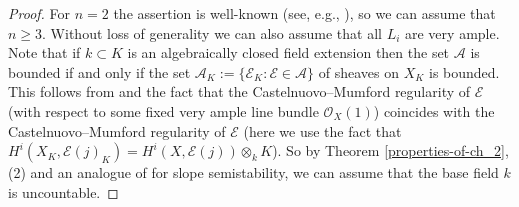 \documentclass[12pt]{article}
\theoremstyle{plain}
\theoremstyle{definition}
\theoremstyle{remark}
\newcommand{\cA}{{\mathcal A}}
\newcommand{\cE}{{\mathcal E}}
\newcommand{\cO}{{\mathcal O}}
\begin{document}
\begin{proof} For $n=2$ the assertion is well-known (see, e.g.,  \cite[Theorem 4.4]{La1}), so we can assume that $n\ge 3$. Without loss of generality we can also  assume that  all $L_i$ are very ample.
Note that if $k\subset K$ is an algebraically closed field extension then the set $\cA$ is bounded if and only if the set $\cA_K:= \{ \cE_K: \cE \in \cA\}$ of sheaves on $X_K$ is bounded. This follows from 
\cite[Lemma 1.7.6]{HL} and the fact that the Castelnuovo--Mumford regularity of $\cE$ (with respect to some fixed very ample line bundle $\cO_X(1)$) coincides with the Castelnuovo--Mumford regularity of $\cE$ (here we use the fact that $H^i(X_K, \cE(j)_K)= H^i(X, \cE (j))\otimes _kK$).
So by  Theorem \ref{properties-of-ch_2}, (2) and an analogue of \cite[Theorem 1.3.7]{HL} for slope semistability, we can assume that the base field $k$ is uncountable.


\end{proof}
\end{document}
